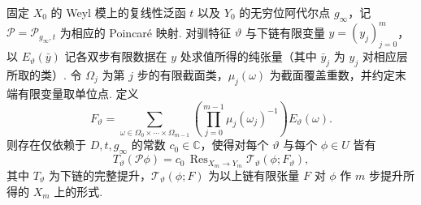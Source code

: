 \begin{lemma}
\label{lem:a-seesaw-unfolding}
\emitthmsource
固定 $X_0$ 的 Weyl 模上的复线性泛函 $t$ 以及 $Y_0$ 的无穷位阿代尔点 $g_\infty$，记 $\mathcal P=\mathcal P_{g_\infty,t}$ 为相应的 Poincaré 映射. 对驯特征 $\vartheta$ 与下链有限变量 $y=(y_j)_{j=0}^m$，以 $E_\vartheta(\bar y)$ 记各双步有限数据在 $y$ 处求值所得的纯张量（其中 $\bar y_j$ 为 $y_j$ 对相应层所取的类）. 令 $\Omega_j$ 为第 $j$ 步的有限截面类，$\mu_j(\omega)$ 为截面覆盖重数，并约定末端有限变量取单位点. 定义
\[
 F_\vartheta
 =\sum_{\omega\in\Omega_0\times\cdots\times\Omega_{m-1}}
  \left(\prod_{j=0}^{m-1}\mu_j(\omega_j)^{-1}\right)E_\vartheta(\omega).
\]
则存在仅依赖于 $D,t,g_\infty$ 的常数 $c_0\in\mathbb C$，使得对每个 $\vartheta$ 与每个 $\phi\in U$ 皆有
\[
 T_\vartheta(\mathcal P\phi)
   = c_0\,\operatorname{Res}_{X_m\to Y_m}
            \mathcal T_\vartheta(\phi;F_\vartheta),
\]
其中 $T_\vartheta$ 为下链的完整提升，$\mathcal T_\vartheta(\phi;F)$ 为以上链有限张量 $F$ 对 $\phi$ 作 $m$ 步提升所得的 $X_m$ 上的形式.
\end{lemma}
